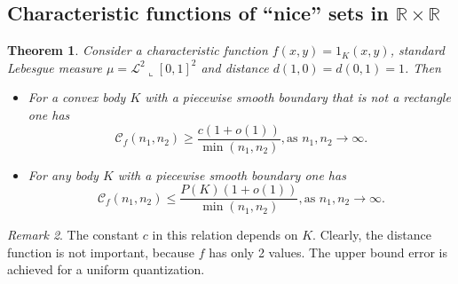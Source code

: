 \documentclass{amsart}
\newtheorem{theorem}{Theorem}[section]
\theoremstyle{remark}
\newtheorem{remark}[theorem]{Remark}
\numberwithin{equation}{section}
\numberwithin{figure}{section}
\newcommand{\R}{\mathbb{R}}
\newcommand{\res}{\llcorner}
\begin{document}


\subsection{Characteristic functions of ``nice'' sets in $\R \times \R$}


\begin{theorem}
	 Consider a characteristic function $f(x, y) = 1_{K}(x, y)$, standard Lebesgue measure $\mu =  \mathcal{L}^2\res [0,1]^2$ and distance $d(1, 0) = d(0, 1) = 1$. Then
	 \begin{itemize}[leftmargin=*]
	 \item For a convex body $K$ with a piecewise smooth boundary that is not a rectangle one has
	 \[
	 \mathcal{C}_f(n_1, n_2) \geq \frac{c(1 + o(1))}{\min(n_1, n_2)}, \mbox{as } n_1, n_2 \to \infty.
	 \]
	 \item For any body $K$ with a piecewise smooth boundary one has
	 \[
	 \mathcal{C}_f(n_1, n_2) \leq \frac{P(K) (1 + o(1))}{\min(n_1, n_2)}, \mbox{as } n_1, n_2 \to \infty.
	 \]
	 \end{itemize}
\end{theorem}
\begin{remark}
	The constant $c$ in this relation depends on $K$. Clearly, the distance function is not important, because $f$ has only 2 values. The upper bound error is achieved for a uniform quantization.
\end{remark}
\end{document}
